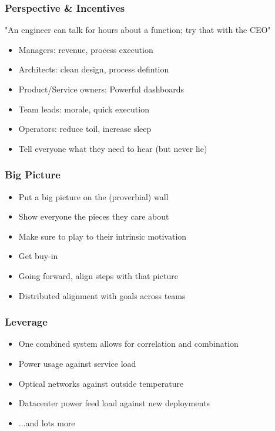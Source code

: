 \documentclass[t]{beamer}
\begin{document}
\begin{frame}
	\frametitle{Perspective \& Incentives}
	"An engineer can talk for hours about a function; try that with the CEO"
	\vfill
	\begin{itemize}
		\item Managers: revenue, process execution
		\item Architects: clean design, process defintion
		\item Product/Service owners: Powerful dashboards
		\item Team leads: morale, quick execution
		\item Operators: reduce toil, increase sleep
		\item Tell everyone what they need to hear (but never lie)
	\end{itemize}
	\vfill
\end{frame}

\begin{frame}
	\frametitle{Big Picture}
	\begin{itemize}
		\item Put a big picture on the (proverbial) wall
		\item Show everyone the pieces they care about
		\item Make sure to play to their intrinsic motivation
		\item Get buy-in
		\item Going forward, align steps with that picture
		\item Distributed alignment with goals across teams
	\end{itemize}
\end{frame}

\begin{frame}
	\frametitle{Leverage}
	\begin{itemize}
		\item One combined system allows for correlation and combination
		\item Power usage against service load
		\item Optical networks against outside temperature
		\item Datacenter power feed load against new deployments
		\item ...and lots more
	\end{itemize}
\end{frame}
\end{document}

